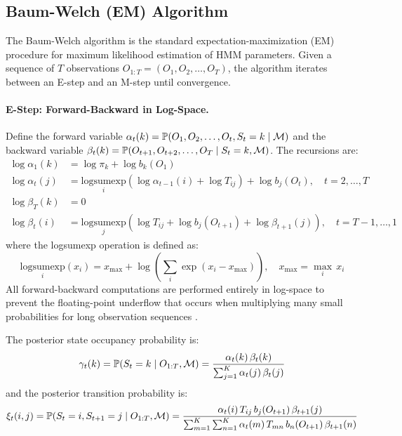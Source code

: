 \subsection{Baum-Welch (EM) Algorithm}
\label{sec:baum_welch}

The Baum-Welch algorithm \citep{baum1970maximization} is the standard expectation-maximization (EM) procedure for maximum likelihood estimation of HMM parameters.
Given a sequence of $T$ observations $O_{1:T} = (O_1, O_2, \ldots, O_T)$, the algorithm iterates between an E-step and an M-step until convergence.

\paragraph{E-Step: Forward-Backward in Log-Space.}
Define the forward variable $\alpha_t(k) = \mathbb{P}(O_1, O_2, \ldots, O_t, S_t = k \mid \mathcal{M})$ and the backward variable $\beta_t(k) = \mathbb{P}(O_{t+1}, O_{t+2}, \ldots, O_T \mid S_t = k, \mathcal{M})$.
The recursions are:
\begin{align}
    \log \alpha_1(k) &= \log \pi_k + \log b_k(O_1) \label{eq:forward_init} \\
    \log \alpha_t(j) &= \underset{i}{\text{logsumexp}}\!\left(\log \alpha_{t-1}(i) + \log T_{ij}\right) + \log b_j(O_t), \quad t = 2, \ldots, T \label{eq:forward} \\[6pt]
    \log \beta_T(k) &= 0 \label{eq:backward_init} \\
    \log \beta_t(i) &= \underset{j}{\text{logsumexp}}\!\left(\log T_{ij} + \log b_j(O_{t+1}) + \log \beta_{t+1}(j)\right), \quad t = T{-}1, \ldots, 1 \label{eq:backward}
\end{align}
where the logsumexp operation is defined as:
\begin{equation}
    \underset{i}{\text{logsumexp}}(x_i) = x_{\max} + \log\!\left(\sum_{i} \exp(x_i - x_{\max})\right), \quad x_{\max} = \max_i\, x_i
    \label{eq:logsumexp}
\end{equation}
All forward-backward computations are performed entirely in log-space to prevent the floating-point underflow that occurs when multiplying many small probabilities for long observation sequences \citep{bilmes1998gentle}.

The posterior state occupancy probability is:
\begin{equation}
    \gamma_t(k) = \mathbb{P}(S_t = k \mid O_{1:T}, \mathcal{M}) = \frac{\alpha_t(k)\,\beta_t(k)}{\sum_{j=1}^{K} \alpha_t(j)\,\beta_t(j)}
    \label{eq:gamma}
\end{equation}
and the posterior transition probability is:
\begin{equation}
    \xi_t(i,j) = \mathbb{P}(S_t = i, S_{t+1} = j \mid O_{1:T}, \mathcal{M}) = \frac{\alpha_t(i)\,T_{ij}\,b_j(O_{t+1})\,\beta_{t+1}(j)}{\sum_{m=1}^{K}\sum_{n=1}^{K}\alpha_t(m)\,T_{mn}\,b_n(O_{t+1})\,\beta_{t+1}(n)}
    \label{eq:xi}
\end{equation}

